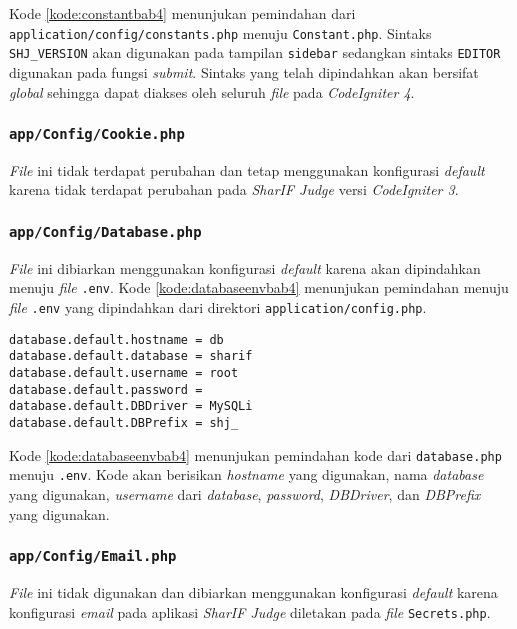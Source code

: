 Kode \ref{kode:constantbab4} menunjukan pemindahan dari \texttt{application/config/constants.php} menuju \texttt{Constant.php}. Sintaks \texttt{SHJ\_VERSION} akan digunakan pada tampilan \texttt{sidebar} sedangkan sintaks \texttt{EDITOR} digunakan pada fungsi \textit{submit}. Sintaks yang telah dipindahkan akan bersifat \textit{global} sehingga dapat diakses oleh seluruh \textit{file} pada \textit{CodeIgniter 4}.

\subsubsection{\texttt{app/Config/Cookie.php}}
\textit{File} ini tidak terdapat perubahan dan tetap menggunakan konfigurasi \textit{default} karena tidak terdapat perubahan pada \textit{SharIF Judge} versi \textit{CodeIgniter 3}.

\subsubsection{\texttt{app/Config/Database.php}}
\textit{File} ini dibiarkan menggunakan konfigurasi \textit{default} karena akan dipindahkan menuju \textit{file} \texttt{.env}. Kode \ref{kode:databaseenvbab4} menunjukan pemindahan menuju \textit{file} \texttt{.env} yang dipindahkan dari direktori \texttt{application/config.php}.

\begin{lstlisting}[caption=Pemindahan \texttt{app/config/database.php} menuju \texttt{.env}, label=kode:databaseenvbab4]
database.default.hostname = db
database.default.database = sharif
database.default.username = root
database.default.password = 
database.default.DBDriver = MySQLi
database.default.DBPrefix = shj_
\end{lstlisting}

Kode \ref{kode:databaseenvbab4} menunjukan pemindahan kode dari \texttt{database.php} menuju \texttt{.env}. Kode akan berisikan \textit{hostname} yang digunakan, nama \textit{database} yang digunakan, \textit{username} dari \textit{database}, \textit{password}, \textit{DBDriver}, dan \textit{DBPrefix} yang digunakan.

\subsubsection{\texttt{app/Config/Email.php}}
\textit{File} ini tidak digunakan dan dibiarkan menggunakan konfigurasi \textit{default} karena konfigurasi \textit{email} pada aplikasi \textit{SharIF Judge} diletakan pada \textit{file} \texttt{Secrets.php}.


